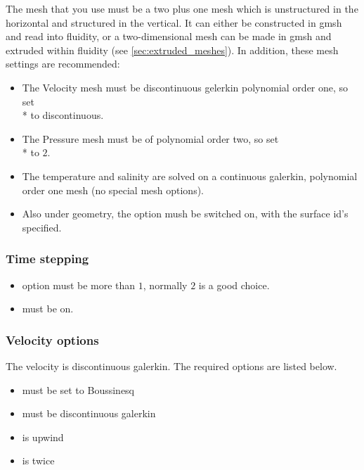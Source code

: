 The mesh that you use must be a two plus one mesh which is unstructured in the horizontal and structured in the vertical.  It can either be constructed in gmsh and read into fluidity, or a two-dimensional mesh can be made in gmsh and extruded within fluidity (see \ref{sec:extruded_meshes}). In addition, these mesh settings are recommended:
\begin{itemize}
\item The Velocity mesh must be discontinuous gelerkin polynomial order one, so set \\*  to discontinuous.  
\item The Pressure mesh must be of polynomial order two, so set 
\\*   to $2$.  
\item The temperature and salinity are solved on a continuous galerkin, polynomial order one mesh (no special mesh options).
\item Also under geometry, the  option mush be switched on, with the surface id's specified.
\end{itemize}

\subsubsection{Time stepping}
\begin{itemize}
\item {} option must be more than $1$, normally $2$ is a good choice.
\item {} must be on.
\end{itemize}

\subsubsection{Velocity options}
The velocity is discontinuous galerkin.  The required options are listed below.

\begin{itemize}
\item {} must be set to Boussinesq
\item {} must be discontinuous galerkin
\item {} is upwind
\item {} is twice
\end{itemize}


